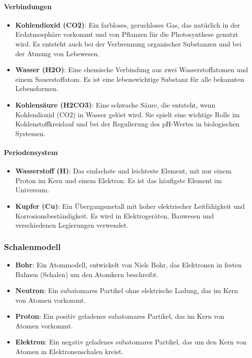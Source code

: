 \documentclass{vorlage-design-main}
\begin{document}
\hypertarget{verbindungen}{%
\paragraph{Verbindungen}\label{verbindungen}}

\begin{itemize}

\item
  \textbf{Kohlendioxid (CO2)}: Ein farbloses, geruchloses Gas, das
  natürlich in der Erdatmosphäre vorkommt und von Pflanzen für die
  Photosynthese genutzt wird. Es entsteht auch bei der Verbrennung
  organischer Substanzen und bei der Atmung von Lebewesen.
\item
  \textbf{Wasser (H2O)}: Eine chemische Verbindung aus zwei
  Wasserstoffatomen und einem Sauerstoffatom. Es ist eine lebenswichtige
  Substanz für alle bekannten Lebensformen.
\item
  \textbf{Kohlensäure (H2CO3)}: Eine schwache Säure, die entsteht, wenn
  Kohlendioxid (CO2) in Wasser gelöst wird. Sie spielt eine wichtige
  Rolle im Kohlenstoffkreislauf und bei der Regulierung des pH-Wertes in
  biologischen Systemen.
\end{itemize}

\hypertarget{periodensystem}{%
\paragraph{Periodensystem}\label{periodensystem}}

\begin{itemize}

\item
  \textbf{Wasserstoff (H)}: Das einfachste und leichteste Element, mit
  nur einem Proton im Kern und einem Elektron. Es ist das häufigste
  Element im Universum.
\item
  \textbf{Kupfer (Cu)}: Ein Übergangsmetall mit hoher elektrischer
  Leitfähigkeit und Korrosionsbeständigkeit. Es wird in Elektrogeräten,
  Bauwesen und verschiedenen Legierungen verwendet.
\end{itemize}

\hypertarget{schalenmodell}{%
\subsubsection{Schalenmodell}\label{schalenmodell}}

\begin{itemize}

\item
  \textbf{Bohr}: Ein Atommodell, entwickelt von Niels Bohr, das
  Elektronen in festen Bahnen (Schalen) um den Atomkern beschreibt.
\item
  \textbf{Neutron}: Ein subatomares Partikel ohne elektrische Ladung,
  das im Kern von Atomen vorkommt.
\item
  \textbf{Proton}: Ein positiv geladenes subatomares Partikel, das im
  Kern von Atomen vorkommt.
\item
  \textbf{Elektron}: Ein negativ geladenes subatomares Partikel, das um
  den Kern von Atomen in Elektronenschalen kreist.
\end{itemize}
\end{document}
